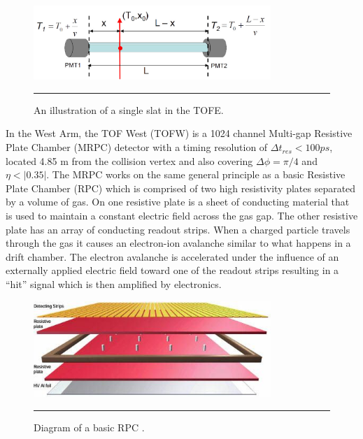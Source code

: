 \begin{figure}[htbp]
  \centering
    \includegraphics[width=0.8\textwidth]{Figures/TOFEcartoon.jpg}
    \rule{35em}{0.5pt}
  \caption[An illustration of a single slat in the TOFE.]{An illustration of a single slat in the TOFE.}
  \label{fig:TOFEcartoon}
\end{figure}

In the West Arm, the TOF West (TOFW) is a 1024 channel Multi-gap Resistive Plate Chamber (MRPC) detector with a timing resolution of $\Delta t_{res} < 100 ps$, located 4.85 m from the collision vertex and also covering $\Delta\phi = \pi / 4$ and $\eta < |0.35|$. The MRPC works on the same general principle as a basic Resistive Plate Chamber (RPC) which is comprised of two high resistivity plates separated by a volume of gas. On one resistive plate is a sheet of conducting material that is used to maintain a constant electric field across the gas gap. The other resistive plate has an array of conducting readout strips. When a charged particle travels through the gas it causes an electron-ion avalanche similar to what happens in a drift chamber. The electron avalanche is accelerated under the influence of an externally applied electric field toward one of the readout strips resulting in a ``hit'' signal which is then amplified by electronics. 

\begin{figure}[h]
  \centering
    \includegraphics[width=0.8\textwidth]{Figures/RPClayers.jpg}
    \rule{35em}{0.5pt}
  \caption[Diagram of a basic RPC.]{Diagram of a basic RPC \citep{CMSRPC}.}
  \label{fig:RPCbasic}
\end{figure}

